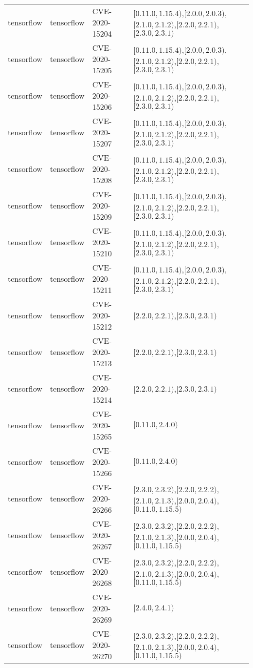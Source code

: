 \begin{tabular}{llll}
tensorflow & tensorflow & CVE-2020-15204 & $[0.11.0,1.15.4)$,$[2.0.0,2.0.3)$,$[2.1.0,2.1.2)$,$[2.2.0,2.2.1)$,$[2.3.0,2.3.1)$ \\
tensorflow & tensorflow & CVE-2020-15205 & $[0.11.0,1.15.4)$,$[2.0.0,2.0.3)$,$[2.1.0,2.1.2)$,$[2.2.0,2.2.1)$,$[2.3.0,2.3.1)$ \\
tensorflow & tensorflow & CVE-2020-15206 & $[0.11.0,1.15.4)$,$[2.0.0,2.0.3)$,$[2.1.0,2.1.2)$,$[2.2.0,2.2.1)$,$[2.3.0,2.3.1)$ \\
tensorflow & tensorflow & CVE-2020-15207 & $[0.11.0,1.15.4)$,$[2.0.0,2.0.3)$,$[2.1.0,2.1.2)$,$[2.2.0,2.2.1)$,$[2.3.0,2.3.1)$ \\
tensorflow & tensorflow & CVE-2020-15208 & $[0.11.0,1.15.4)$,$[2.0.0,2.0.3)$,$[2.1.0,2.1.2)$,$[2.2.0,2.2.1)$,$[2.3.0,2.3.1)$ \\
tensorflow & tensorflow & CVE-2020-15209 & $[0.11.0,1.15.4)$,$[2.0.0,2.0.3)$,$[2.1.0,2.1.2)$,$[2.2.0,2.2.1)$,$[2.3.0,2.3.1)$ \\
tensorflow & tensorflow & CVE-2020-15210 & $[0.11.0,1.15.4)$,$[2.0.0,2.0.3)$,$[2.1.0,2.1.2)$,$[2.2.0,2.2.1)$,$[2.3.0,2.3.1)$ \\
tensorflow & tensorflow & CVE-2020-15211 & $[0.11.0,1.15.4)$,$[2.0.0,2.0.3)$,$[2.1.0,2.1.2)$,$[2.2.0,2.2.1)$,$[2.3.0,2.3.1)$ \\
tensorflow & tensorflow & CVE-2020-15212 & $[2.2.0,2.2.1)$,$[2.3.0,2.3.1)$ \\
tensorflow & tensorflow & CVE-2020-15213 & $[2.2.0,2.2.1)$,$[2.3.0,2.3.1)$ \\
tensorflow & tensorflow & CVE-2020-15214 & $[2.2.0,2.2.1)$,$[2.3.0,2.3.1)$ \\
tensorflow & tensorflow & CVE-2020-15265 & $[0.11.0,2.4.0)$ \\
tensorflow & tensorflow & CVE-2020-15266 & $[0.11.0,2.4.0)$ \\
tensorflow & tensorflow & CVE-2020-26266 & $[2.3.0,2.3.2)$,$[2.2.0,2.2.2)$,$[2.1.0,2.1.3)$,$[2.0.0,2.0.4)$,$[0.11.0,1.15.5)$ \\
tensorflow & tensorflow & CVE-2020-26267 & $[2.3.0,2.3.2)$,$[2.2.0,2.2.2)$,$[2.1.0,2.1.3)$,$[2.0.0,2.0.4)$,$[0.11.0,1.15.5)$ \\
tensorflow & tensorflow & CVE-2020-26268 & $[2.3.0,2.3.2)$,$[2.2.0,2.2.2)$,$[2.1.0,2.1.3)$,$[2.0.0,2.0.4)$,$[0.11.0,1.15.5)$ \\
tensorflow & tensorflow & CVE-2020-26269 & $[2.4.0,2.4.1)$ \\
tensorflow & tensorflow & CVE-2020-26270 & $[2.3.0,2.3.2)$,$[2.2.0,2.2.2)$,$[2.1.0,2.1.3)$,$[2.0.0,2.0.4)$,$[0.11.0,1.15.5)$ \\

\end{tabular}
